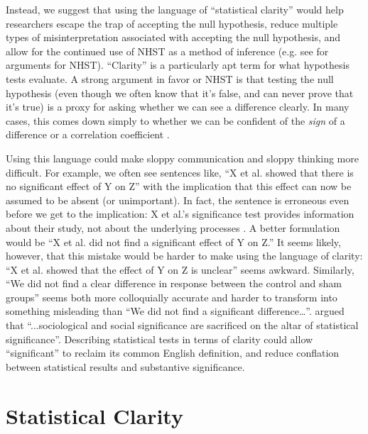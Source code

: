 Instead, we suggest that using the language of ``statistical clarity'' would help researchers escape the trap of accepting 
the null hypothesis, reduce multiple types of misinterpretation associated with accepting the null hypothesis, and allow for
the continued use of NHST as a method of inference (e.g.
see \citealt{Abelson1997} for arguments for NHST).
``Clarity'' is a particularly apt term for what hypothesis tests evaluate. A strong argument in favor or NHST is that testing the null hypothesis (even though we often know that it's false, and can never prove that it's true)  is a proxy for asking whether we can see a difference clearly. In many cases, this comes down simply to whether we can be confident of the \emph{sign} of a difference or a correlation coefficient \cite{robinson2001past}.

Using this language could make sloppy communication and sloppy thinking more difficult. 
For example, we often see sentences like, ``X et al. showed that there is no significant effect of Y on Z'' with the implication that this effect can now be assumed to be absent (or unimportant).
In fact, the sentence is erroneous even before we get to the implication: X et al.'s significance test provides information about their study, not about the underlying processes \cite{CanWeCiteThis}.
A better formulation would be ``X et al. did not find a significant effect of Y on Z.''
It seems likely, however, that this mistake would be harder to make using the language of clarity:  ``X et al. showed that the effect of Y on Z is unclear'' seems awkward.
Similarly, ``We did not find a clear difference in response between the control and sham groups'' seems both more colloquially accurate and harder to transform into something misleading than ``We did not find a significant difference\ldots''.
\citet{Bernardietal.2017} argued that ``...sociological and social significance are sacrificed on the altar of statistical significance''.
Describing statistical tests in terms of clarity could allow ``significant'' to reclaim its common English definition, and reduce conflation between statistical results and substantive significance.

\section*{Statistical Clarity}


